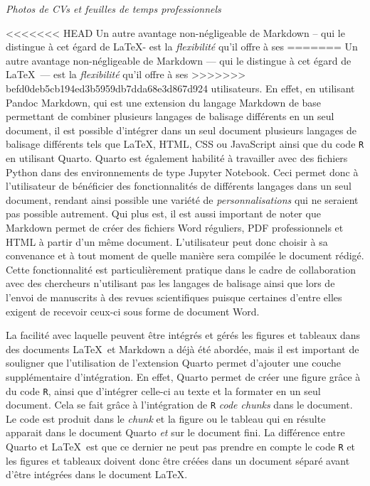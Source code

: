 \documentclass[
  letterpaper,
]{scrbook}
\begin{document}
\emph{Photos de CVs et feuilles de temps professionnels}

<<<<<<< HEAD
Un autre avantage non-négligeable de Markdown -- qui le distingue à cet
égard de \LaTeX - est la \emph{flexibilité} qu'il offre à ses
=======
Un autre avantage non-négligeable de Markdown --- qui le distingue à cet
égard de \LaTeX~--- est la \emph{flexibilité} qu'il offre à ses
>>>>>>> befd0deb5cb194ed3b5959db7dda68e3d867d924
utilisateurs. En effet, en utilisant Pandoc Markdown, qui est une
extension du langage Markdown de base permettant de combiner plusieurs
langages de balisage différents en un seul document, il est possible
d'intégrer dans un seul document plusieurs langages de balisage
différents tels que \LaTeX, HTML, CSS ou JavaScript ainsi que du code
\texttt{R} en utilisant Quarto. Quarto est également habilité à
travailler avec des fichiers Python dans des environnements de type
Jupyter Notebook. Ceci permet donc à l'utilisateur de bénéficier des
fonctionnalités de différents langages dans un seul document, rendant
ainsi possible une variété de \emph{personnalisations} qui ne seraient
pas possible autrement. Qui plus est, il est aussi important de noter
que Markdown permet de créer des fichiers Word réguliers, PDF
professionnels et HTML à partir d'un même document. L'utilisateur peut
donc choisir à sa convenance et à tout moment de quelle manière sera
compilée le document rédigé. Cette fonctionnalité est particulièrement
pratique dans le cadre de collaboration avec des chercheurs n'utilisant
pas les langages de balisage ainsi que lors de l'envoi de manuscrits à
des revues scientifiques puisque certaines d'entre elles exigent de
recevoir ceux-ci sous forme de document Word.

La facilité avec laquelle peuvent être intégrés et gérés les figures et
tableaux dans des documents \LaTeX~et Markdown a déjà été abordée, mais
il est important de souligner que l'utilisation de l'extension Quarto
permet d'ajouter une couche supplémentaire d'intégration. En effet,
Quarto permet de créer une figure grâce à du code \texttt{R}, ainsi que
d'intégrer celle-ci au texte et la formater en un seul document. Cela se
fait grâce à l'intégration de \texttt{R} \emph{code chunks} dans le
document. Le code est produit dans le \emph{chunk} et la figure ou le
tableau qui en résulte apparait dans le document Quarto \emph{et} sur le
document fini. La différence entre Quarto et \LaTeX~est que ce dernier
ne peut pas prendre en compte le code \texttt{R} et les figures et
tableaux doivent donc être créées dans un document séparé avant d'être
intégrées dans le document \LaTeX.
\end{document}
